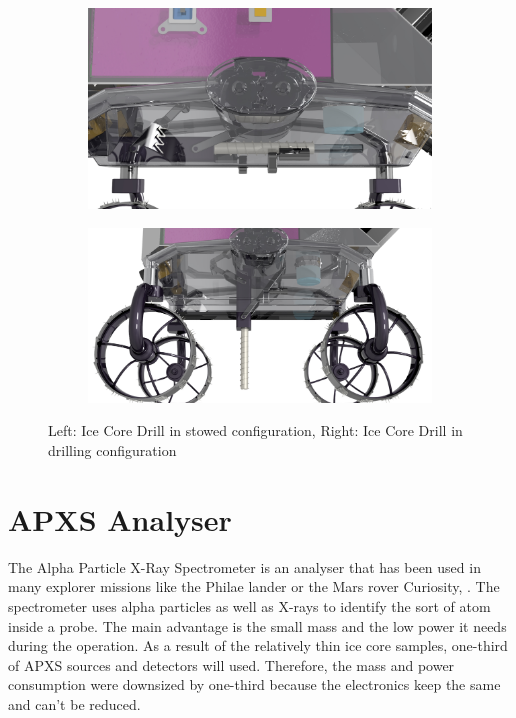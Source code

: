 \begin{figure}[htb]
     \centering
     \begin{subfigure}[b]{0.45\textwidth}
         \centering
         \includegraphics[width=\textwidth]{Media/DrillingBay3}
         \label{fig:stowedDrill}
     \end{subfigure}
     \hfill
     \begin{subfigure}[b]{0.45\textwidth}
         \centering
         \includegraphics[width=\textwidth]{Media/DrillingBay_unfolded2}
         \label{fig:drillconfig}
     \end{subfigure}
     \hfill
     \caption{Left: Ice Core Drill in stowed configuration, Right: Ice Core Drill in drilling configuration}
     \label{fig:DrillBay}
\end{figure}

\section{APXS Analyser}
The Alpha Particle X-Ray Spectrometer is an analyser that has been used in many explorer missions like the Philae lander or the Mars rover Curiosity, \cite{ref_pay_1} \cite{ref_pay_2}.
The spectrometer uses alpha particles as well as X-rays to identify the sort of atom inside a probe.
The main advantage is the small mass and the  low power it needs during the operation.
As a result of the relatively thin ice core samples, one-third of APXS sources and detectors will used.
Therefore, the mass and power consumption were downsized by one-third because the electronics keep the same and can't be reduced.


